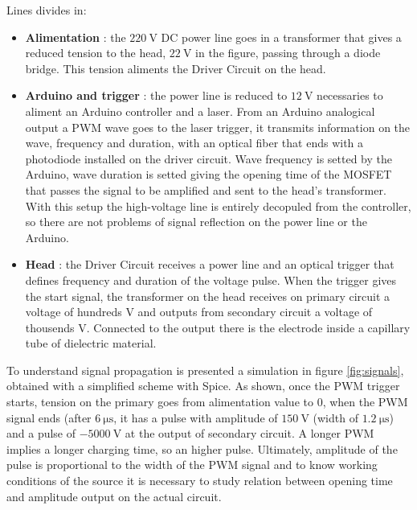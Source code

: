 Lines divides in:
\begin{itemize}
 \item \textbf{Alimentation} : the $\SI{220}{\volt}$ DC power line goes in a transformer that gives a reduced tension to the head, $\SI{22}{\volt}$ in the figure, passing through a diode bridge. This tension aliments the Driver Circuit on the head.
 \item \textbf{Arduino and trigger} : the power line is reduced to $\SI{12}{\volt}$ necessaries to aliment an Arduino controller and a laser. From an Arduino analogical output a PWM wave goes to the laser trigger, it transmits information on the wave, frequency and duration, with an optical fiber that ends with a photodiode installed on the driver circuit. Wave frequency is setted by the Arduino, wave duration is setted giving the opening time of the MOSFET that passes the signal to be amplified and sent to the head's transformer. With this setup the high-voltage line is entirely decopuled from the controller, so there are not problems of signal reflection on the power line or the Arduino.
 \item \textbf{Head} : the Driver Circuit receives a power line and an optical trigger that defines frequency and duration of the voltage pulse. When the trigger gives the start signal, the transformer on the head receives on primary circuit a voltage of hundreds $\si{\volt}$ and outputs from secondary circuit a voltage of thousends $\si{\volt}$. Connected to the output there is the electrode inside a capillary tube of dielectric material.
\end{itemize}

To understand signal propagation is presented a simulation in figure \ref{fig:signals}, obtained with a simplified scheme with Spice. As shown, once the PWM trigger starts, tension on the primary goes from alimentation value to $0$, when the PWM signal ends (after $\SI{6}{\micro\second}$, it has a pulse with amplitude of $\SI{150}{\volt}$ (width of $\SI{1.2}{\micro\second}$) and a pulse of $\SI{-5000}{\volt}$ at the output of secondary circuit. A longer PWM implies a longer charging time, so an higher pulse. Ultimately, amplitude of the pulse is proportional to the width of the PWM signal and to know working conditions of the source it is necessary to study relation between opening time and amplitude output on the actual circuit.


